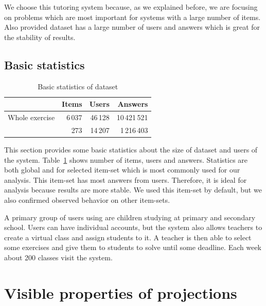 \documentclass[
  printed, %
  table,   %
  nolof,     %
  nolot,     %
  color,
  final,
  nocover
]{fithesis3}
\begin{document}

We choose this tutoring system because, as we explained before, we are focusing on problems which are most important for systems with a large number of items. Also provided dataset has a large number of users and answers which is great for the stability of results.


\subsection{Basic statistics}\label{basic-statistics}

\begin{table}
  \begin{tabular}{|l|r r r|}
    \hline
    \cellcolor[gray]{1.0} & Items & Users & Answers \\
    \hline
    Whole exercise & 6\,037 & 46\,128 & 10\,421\,521 \\
    \cviceniB{} & 273 & 14\,207 & 1\,216\,403 \\
    \hline
  \end{tabular}
  \caption{Basic statistics of dataset}
  \label{tab:basic-statistics}
\end{table}

This section provides some basic statistics about the size of dataset and users of the system. Table~\ref{tab:basic-statistics} shows number of items, users and answers. Statistics are both global and for selected item-set \cviceniB{} which is most commonly used for our analysis. This item-set has most answers from users. Therefore, it is ideal for analysis because results are more stable. We used this item-set by default, but we also confirmed observed behavior on other item-sets.


A primary group of users using \umimeCesky{} are children studying at primary and secondary school. Users can have individual accounts, but the system also allows teachers to create a virtual class and assign students to it. A teacher is then able to select some exercises and give them to students to solve until some deadline. Each week about 200 classes visit the system.


\section{Visible properties of projections}\label{visible-properties-of-projections}
\end{document}
